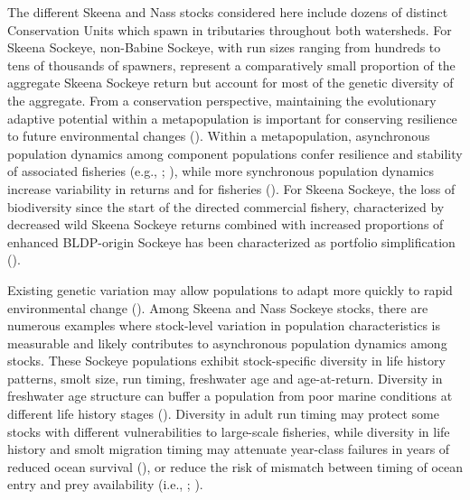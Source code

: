 \documentclass[french,11pt]{book}
\begin{document}
The different Skeena and Nass stocks considered here include dozens of distinct Conservation Units which spawn in tributaries throughout both watersheds. For Skeena Sockeye, non-Babine Sockeye, with run sizes ranging from hundreds to tens of thousands of spawners, represent a comparatively small proportion of the aggregate Skeena Sockeye return but account for most of the genetic diversity of the aggregate. From a conservation perspective, maintaining the evolutionary adaptive potential within a metapopulation is important for conserving resilience to future environmental changes (). Within a metapopulation, asynchronous population dynamics among component populations confer resilience and stability of associated fisheries (e.g., ; ), while more synchronous population dynamics increase variability in returns and for fisheries (). For Skeena Sockeye, the loss of biodiversity since the start of the directed commercial fishery, characterized by decreased wild Skeena Sockeye returns combined with increased proportions of enhanced BLDP-origin Sockeye has been characterized as portfolio simplification ().

Existing genetic variation may allow populations to adapt more quickly to rapid environmental change (). Among Skeena and Nass Sockeye stocks, there are numerous examples where stock-level variation in population characteristics is measurable and likely contributes to asynchronous population dynamics among stocks. These Sockeye populations exhibit stock-specific diversity in life history patterns, smolt size, run timing, freshwater age and age-at-return. Diversity in freshwater age structure can buffer a population from poor marine conditions at different life history stages (). Diversity in adult run timing may protect some stocks with different vulnerabilities to large-scale fisheries, while diversity in life history and smolt migration timing may attenuate year-class failures in years of reduced ocean survival (), or reduce the risk of mismatch between timing of ocean entry and prey availability (i.e., ; ).
\end{document}
